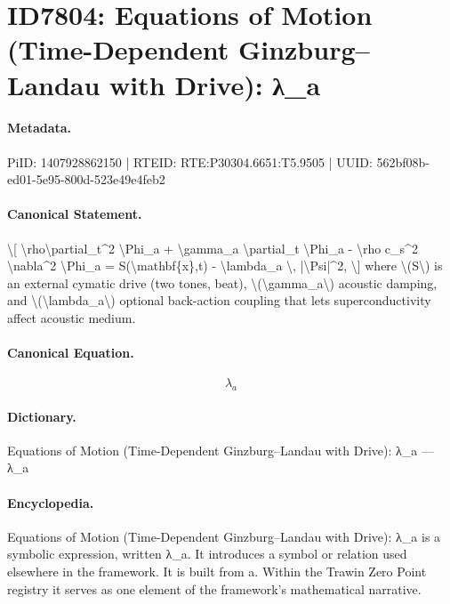 \section*{ID7804: Equations of Motion (Time-Dependent Ginzburg–Landau with Drive): λ\_a}
\paragraph{Metadata.}
PiID: 1407928862150 | RTEID: RTE:P30304.6651:T5.9505 | UUID: 562bf08b-ed01-5e95-800d-523e49e4feb2

\paragraph{Canonical Statement.}
\textbackslash{}[ \textbackslash{}rho\textbackslash{}partial\_t\textasciicircum{}2 \textbackslash{}Phi\_a + \textbackslash{}gamma\_a \textbackslash{}partial\_t \textbackslash{}Phi\_a - \textbackslash{}rho c\_s\textasciicircum{}2 \textbackslash{}nabla\textasciicircum{}2 \textbackslash{}Phi\_a = S(\textbackslash{}mathbf\{x\},t) - \textbackslash{}lambda\_a \textbackslash{}, |\textbackslash{}Psi|\textasciicircum{}2, \textbackslash{}] where \textbackslash{}(S\textbackslash{}) is an external cymatic drive (two tones, beat), \textbackslash{}(\textbackslash{}gamma\_a\textbackslash{}) acoustic damping, and \textbackslash{}(\textbackslash{}lambda\_a\textbackslash{}) optional back-action coupling that lets superconductivity affect acoustic medium.

\paragraph{Canonical Equation.}
\[
\lambda_a
\]

\paragraph{Dictionary.}
Equations of Motion (Time-Dependent Ginzburg–Landau with Drive): λ\_a — λ\_a

\paragraph{Encyclopedia.}
Equations of Motion (Time-Dependent Ginzburg–Landau with Drive): λ\_a is a symbolic expression, written λ\_a. It introduces a symbol or relation used elsewhere in the framework. It is built from a. Within the Trawin Zero Point registry it serves as one element of the framework's mathematical narrative.

